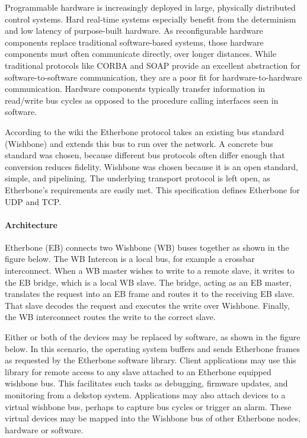 \vspace{5 mm}

\noindent Programmable hardware is increasingly deployed in large, physically distributed control systems. 
Hard real-time systems especially benefit from the determinism and low latency of purpose-built hardware. 
As reconfigurable hardware components replace traditional software-based systems, those hardware components must often communicate directly, over longer distances. 
While traditional protocols like CORBA and SOAP provide an excellent abstraction for software-to-software communication, they are a poor fit for hardware-to-hardware communication. 
Hardware components typically transfer information in read/write bus cycles as opposed to the procedure calling interfaces seen in software.

\vspace{5 mm}

\noindent According to the wiki \cite{etherbone-core:wiki} the Etherbone protocol takes an existing bus standard (Wishbone) and extends this bus to run over the network. 
A concrete bus standard was chosen, because different bus protocols often differ enough that conversion reduces fidelity. 
Wishbone was chosen because it is an open standard, simple, and pipelining. 
The underlying transport protocol is left open, as Etherbone's requirements are easily met. 
This specification defines Etherbone for UDP and TCP.

\paragraph{Architecture}

Etherbone (EB) connects two Wishbone (WB) buses together as shown in the figure below. 
The WB Intercon is a local bus, for example a crossbar interconnect. 
When a WB master wishes to write to a remote slave, it writes to the EB bridge, which is a local WB slave. 
The bridge, acting as an EB master, translates the request into an EB frame and routes it to the receiving EB slave. 
That slave decodes the request and executes the write over Wishbone. 
Finally, the WB interconnect routes the write to the correct slave.

\vspace{5 mm}

\noindent Either or both of the devices may be replaced by software, as shown in the figure below. 
In this scenario, the operating system buffers and sends Etherbone frames as requested by the Etherbone software library.
Client applications may use this library for remote access to any slave attached to an Etherbone equipped wishbone bus. 
This facilitates such tasks as debugging, firmware updates, and monitoring from a dekstop system. 
Applications may also attach devices to a virtual wishbone bus, perhaps to capture bus cycles or trigger an alarm. 
These virtual devices may be mapped into the Wishbone bus of other Etherbone nodes, hardware or software.

